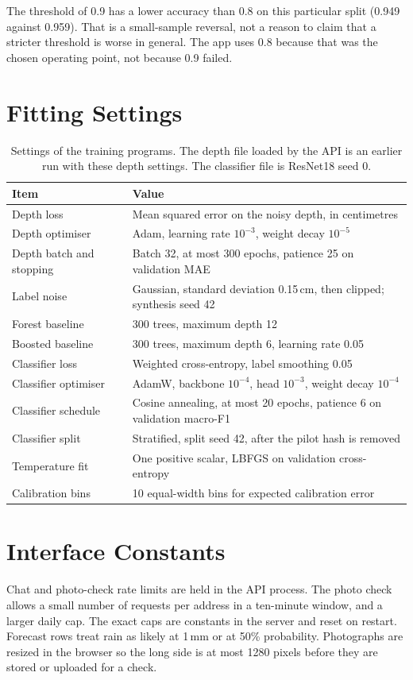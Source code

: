 The threshold of 0.9 has a lower accuracy than 0.8 on this particular split (0.949 against 0.959). That is a small-sample reversal, not a reason to claim that a stricter threshold is worse in general. The app uses 0.8 because that was the chosen operating point, not because 0.9 failed.

\section{Fitting Settings}
\begin{table}[H]
\centering
\caption{Settings of the training programs. The depth file loaded by the API is an earlier run with these depth settings. The classifier file is ResNet18 seed 0.}
\label{tab:fit}
\small
\begin{tabularx}{\textwidth}{lX}
\toprule
\textbf{Item} & \textbf{Value} \\
\midrule
Depth loss & Mean squared error on the noisy depth, in centimetres \\
Depth optimiser & Adam, learning rate $10^{-3}$, weight decay $10^{-5}$ \\
Depth batch and stopping & Batch 32, at most 300 epochs, patience 25 on validation MAE \\
Label noise & Gaussian, standard deviation 0.15\,cm, then clipped; synthesis seed 42 \\
Forest baseline & 300 trees, maximum depth 12 \\
Boosted baseline & 300 trees, maximum depth 6, learning rate 0.05 \\
Classifier loss & Weighted cross-entropy, label smoothing 0.05 \\
Classifier optimiser & AdamW, backbone $10^{-4}$, head $10^{-3}$, weight decay $10^{-4}$ \\
Classifier schedule & Cosine annealing, at most 20 epochs, patience 6 on validation macro-F1 \\
Classifier split & Stratified, split seed 42, after the pilot hash is removed \\
Temperature fit & One positive scalar, LBFGS on validation cross-entropy \\
Calibration bins & 10 equal-width bins for expected calibration error \\
\bottomrule
\end{tabularx}
\end{table}

\section{Interface Constants}
Chat and photo-check rate limits are held in the API process. The photo check allows a small number of requests per address in a ten-minute window, and a larger daily cap. The exact caps are constants in the server and reset on restart. Forecast rows treat rain as likely at 1\,mm or at 50\% probability. Photographs are resized in the browser so the long side is at most 1280 pixels before they are stored or uploaded for a check.
